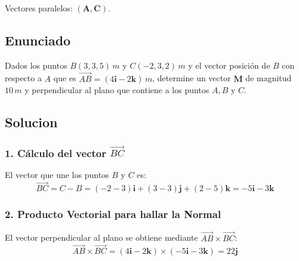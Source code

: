 \documentclass[12pt, a4paper]{article}
\begin{document}
\begin{tcolorbox}[colback=green!5, colframe=green!50!black, title=Respuesta Final]
Vectores paralelos: $(\mathbf{A}, \mathbf{C})$.
\end{tcolorbox}

\newpage

\subsection*{Enunciado}
Dados los puntos $B (3, 3, 5) \, \si{m}$ y $C (-2, 3, 2) \, \si{m}$ y el vector posición de $B$ con respecto a $A$ que es $\vec{AB} = (4\mathbf{i} - 2\mathbf{k}) \, \si{m}$, determine un vector $\mathbf{M}$ de magnitud $10 \, \si{m}$ y perpendicular al plano que contiene a los puntos $A, B$ y $C$.

\begin{center}
\end{center}

\subsection*{Solucion}

\subsubsection*{1. Cálculo del vector $\vec{BC}$}
El vector que une los puntos $B$ y $C$ es:
\begin{equation*}
    \vec{BC} = C - B = (-2-3)\mathbf{i} + (3-3)\mathbf{j} + (2-5)\mathbf{k} = -5\mathbf{i} - 3\mathbf{k} \text{}
\end{equation*}

\subsubsection*{2. Producto Vectorial para hallar la Normal}
El vector perpendicular al plano se obtiene mediante $\vec{AB} \times \vec{BC}$:
\begin{equation*}
    \vec{AB} \times \vec{BC} = (4\mathbf{i} - 2\mathbf{k}) \times (-5\mathbf{i} - 3\mathbf{k}) = 22\mathbf{j} \text{}
\end{equation*}
\end{document}
